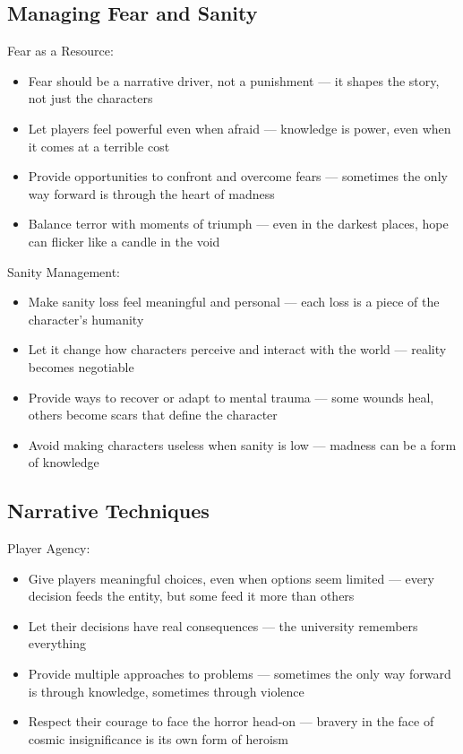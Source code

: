 \documentclass[11pt]{article}
\begin{document}
\subsection{Managing Fear and Sanity}

Fear as a Resource:
\begin{itemize}
\item Fear should be a narrative driver, not a punishment --- it shapes the story, not just the characters
\item Let players feel powerful even when afraid --- knowledge is power, even when it comes at a terrible cost
\item Provide opportunities to confront and overcome fears --- sometimes the only way forward is through the heart of madness
\item Balance terror with moments of triumph --- even in the darkest places, hope can flicker like a candle in the void
\end{itemize}

Sanity Management:
\begin{itemize}
\item Make sanity loss feel meaningful and personal --- each loss is a piece of the character's humanity
\item Let it change how characters perceive and interact with the world --- reality becomes negotiable
\item Provide ways to recover or adapt to mental trauma --- some wounds heal, others become scars that define the character
\item Avoid making characters useless when sanity is low --- madness can be a form of knowledge
\end{itemize}

\subsection{Narrative Techniques}

Player Agency:
\begin{itemize}
\item Give players meaningful choices, even when options seem limited --- every decision feeds the entity, but some feed it more than others
\item Let their decisions have real consequences --- the university remembers everything
\item Provide multiple approaches to problems --- sometimes the only way forward is through knowledge, sometimes through violence
\item Respect their courage to face the horror head-on --- bravery in the face of cosmic insignificance is its own form of heroism
\end{itemize}
\end{document}
